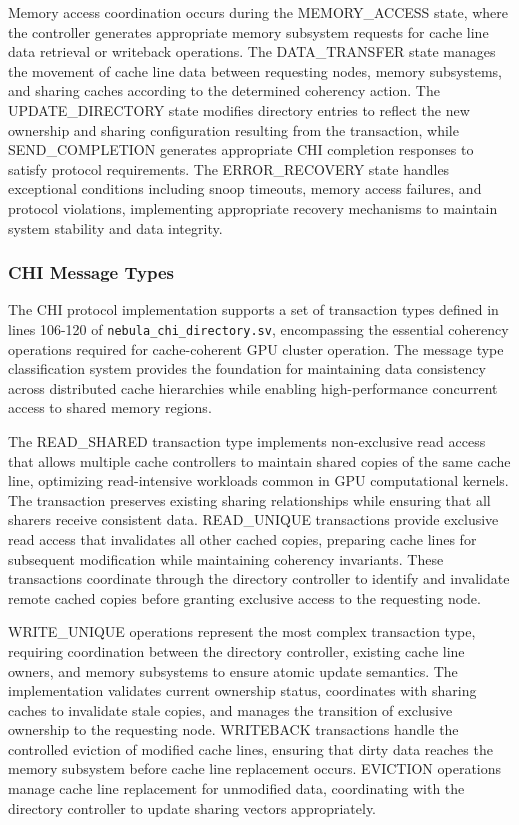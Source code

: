 \documentclass[12pt,letterpaper]{article}
\begin{document}
Memory access coordination occurs during the MEMORY\_ACCESS state, where the controller generates appropriate memory subsystem requests for cache line data retrieval or writeback operations. The DATA\_TRANSFER state manages the movement of cache line data between requesting nodes, memory subsystems, and sharing caches according to the determined coherency action. The UPDATE\_DIRECTORY state modifies directory entries to reflect the new ownership and sharing configuration resulting from the transaction, while SEND\_COMPLETION generates appropriate CHI completion responses to satisfy protocol requirements. The ERROR\_RECOVERY state handles exceptional conditions including snoop timeouts, memory access failures, and protocol violations, implementing appropriate recovery mechanisms to maintain system stability and data integrity.

\subsubsection{CHI Message Types}

The CHI protocol implementation supports a set of transaction types defined in lines 106-120 of \texttt{nebula\_chi\_directory.sv}, encompassing the essential coherency operations required for cache-coherent GPU cluster operation. The message type classification system provides the foundation for maintaining data consistency across distributed cache hierarchies while enabling high-performance concurrent access to shared memory regions.

The READ\_SHARED transaction type implements non-exclusive read access that allows multiple cache controllers to maintain shared copies of the same cache line, optimizing read-intensive workloads common in GPU computational kernels. The transaction preserves existing sharing relationships while ensuring that all sharers receive consistent data. READ\_UNIQUE transactions provide exclusive read access that invalidates all other cached copies, preparing cache lines for subsequent modification while maintaining coherency invariants. These transactions coordinate through the directory controller to identify and invalidate remote cached copies before granting exclusive access to the requesting node.

WRITE\_UNIQUE operations represent the most complex transaction type, requiring coordination between the directory controller, existing cache line owners, and memory subsystems to ensure atomic update semantics. The implementation validates current ownership status, coordinates with sharing caches to invalidate stale copies, and manages the transition of exclusive ownership to the requesting node. WRITEBACK transactions handle the controlled eviction of modified cache lines, ensuring that dirty data reaches the memory subsystem before cache line replacement occurs. EVICTION operations manage cache line replacement for unmodified data, coordinating with the directory controller to update sharing vectors appropriately.
\end{document}
